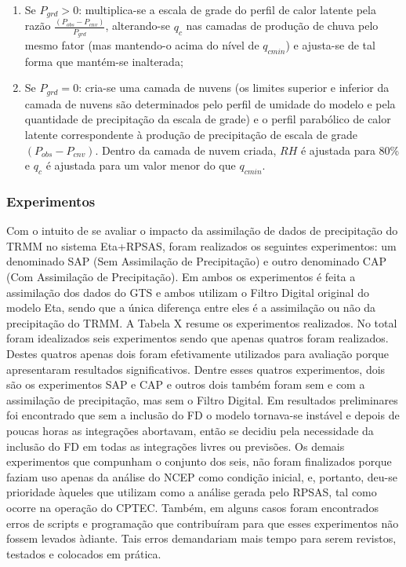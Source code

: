 \begin{enumerate}
\item Se $P_{grd}>0$: multiplica-se a escala de grade do perfil de calor latente pela razão $\frac{(P_{obs}-P_{cnv})}{P_{grd}}$, alterando-se $q_{c}$ nas camadas de produção de chuva pelo mesmo fator (mas mantendo-o acima do nível de $q_{cmin}$) e ajusta-se de tal forma que mantém-se inalterada;
\item Se $P_{grd}=0$: cria-se uma camada de nuvens (os limites superior e inferior da camada de nuvens são determinados pelo perfil de umidade do modelo e pela quantidade de precipitação da escala de grade) e o perfil parabólico de calor latente correspondente à produção de precipitação de escala de grade $(P_{obs}-P_{cnv})$. Dentro da camada de nuvem criada, $RH$ é ajustada para 80\% e $q_{c}$ é ajustada para um valor menor do que $q_{cmin}$.
\end{enumerate}

\subsubsection{Experimentos}

Com o intuito de se avaliar o impacto da assimilação de dados de precipitação do TRMM no sistema Eta+RPSAS, foram realizados os seguintes experimentos: um denominado SAP (Sem Assimilação de Precipitação) e outro denominado CAP (Com Assimilação de Precipitação). Em ambos os experimentos é feita a assimilação dos dados do GTS e ambos utilizam o Filtro Digital original do modelo Eta, sendo que a única diferença entre eles é a assimilação ou não da precipitação do TRMM. A Tabela X resume os experimentos realizados. No total foram idealizados seis experimentos sendo que apenas quatros foram realizados. Destes quatros apenas dois foram efetivamente utilizados para avaliação porque apresentaram resultados significativos. Dentre esses quatros experimentos, dois são os experimentos SAP e CAP e outros dois também foram sem e com a assimilação de precipitação, mas sem o Filtro Digital. Em resultados preliminares foi encontrado que sem a inclusão do FD o modelo tornava-se instável e depois de poucas horas as integrações abortavam, então se decidiu pela necessidade da inclusão do FD em todas as integrações livres ou previsões. Os demais experimentos que compunham o conjunto dos seis, não foram finalizados porque faziam uso apenas da análise do NCEP como condição inicial, e, portanto, deu-se prioridade àqueles que utilizam como a análise gerada pelo RPSAS, tal como ocorre na operação do CPTEC. Também, em alguns casos foram encontrados erros de scripts e programação que contribuíram para que esses experimentos não fossem levados àdiante. Tais erros demandariam mais tempo para serem revistos, testados e colocados em prática. 


